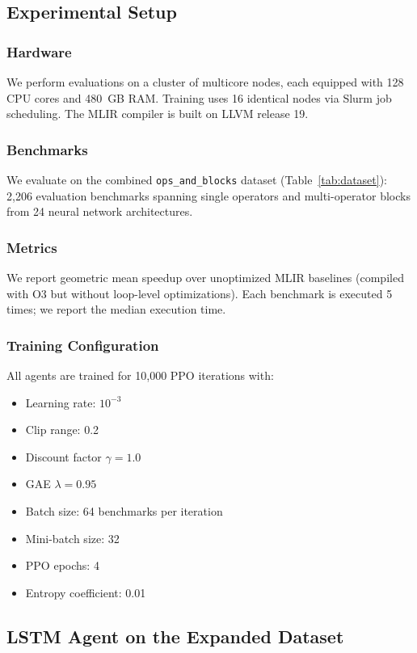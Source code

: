 \documentclass[10pt,twocolumn]{article}
\begin{document}
\subsection{Experimental Setup}

\subsubsection{Hardware}
We perform evaluations on a cluster of multicore nodes, each equipped with 128 CPU cores and 480~GB RAM. Training uses 16 identical nodes via Slurm job scheduling. The MLIR compiler is built on LLVM release 19.

\subsubsection{Benchmarks}
We evaluate on the combined \texttt{ops\_and\_blocks} dataset (Table~\ref{tab:dataset}): 2,206 evaluation benchmarks spanning single operators and multi-operator blocks from 24 neural network architectures.

\subsubsection{Metrics}
We report geometric mean speedup over unoptimized MLIR baselines (compiled with O3 but without loop-level optimizations). Each benchmark is executed 5 times; we report the median execution time.

\subsubsection{Training Configuration}
All agents are trained for 10,000 PPO iterations with:
\begin{itemize}
\item Learning rate: $10^{-3}$
\item Clip range: 0.2
\item Discount factor $\gamma = 1.0$
\item GAE $\lambda = 0.95$
\item Batch size: 64 benchmarks per iteration
\item Mini-batch size: 32
\item PPO epochs: 4
\item Entropy coefficient: 0.01
\end{itemize}

\subsection{LSTM Agent on the Expanded Dataset}
\end{document}
